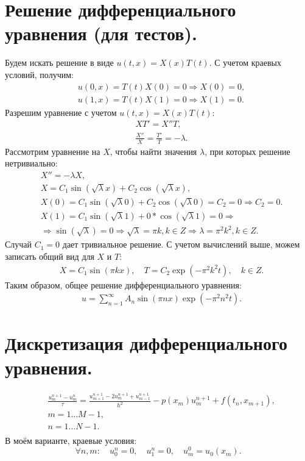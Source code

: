 \documentclass[14pt,a4paper]{extarticle}
\newcommand{\1}{\mathbbm{1}}
\begin{document}
\section{Решение дифференциального уравнения (для тестов).}\label{solution}
Будем искать решение в виде $u(t, x) = X(x) T(t)$. С учетом краевых условий, получим:
\begin{align*} 
    & u(0, x) = T(t) X(0) = 0 \Rightarrow X(0) = 0, \\
    & u(1, x) = T(t) X(1) = 0 \Rightarrow X(1) = 0.
\end{align*}
Разрешим уравнение с учетом $u(t, x) = X(x) T(t)$:
\begin{align*} 
    & X T' = X'' T, \\
    & \frac{X''}{X} = \frac{T'}{T} = -\lambda.
\end{align*}
Рассмотрим уравнение на $X$, чтобы найти значения $\lambda$, при которых решение нетривиально:
\begin{align*} 
    & X'' = -\lambda X, \\
    & X = C_1 \sin(\sqrt{\lambda} x) + C_2 \cos (\sqrt{\lambda} x), \\
    & X(0) = C_1 \sin(\sqrt{\lambda} 0) + C_2 \cos (\sqrt{\lambda} 0) = C_2 = 0 \Rightarrow C_2 = 0. \\
    & X(1) = C_1 \sin(\sqrt{\lambda} 1) + 0 * \cos (\sqrt{\lambda} 1)= 0 \Rightarrow \\ 
    & \Rightarrow \sin(\sqrt{\lambda}) = 0 \Rightarrow \sqrt{\lambda} = \pi k, k \in Z \Rightarrow \lambda = \pi^2 k^2, k \in Z.
\end{align*}
Случай $C_1 = 0$ дает тривиальное решение. С учетом вычислений выше, можем записать общий вид для $X$ и $T$:
\begin{align*} 
    & X = C_1 \sin(\pi k x), \quad T = C_2 \exp{(-\pi^2 k^2 t)}, \quad k \in Z.
\end{align*}
Таким образом, общее решение дифференциального уравнения:
\begin{align*} 
    & u = \sum_{n = 1}^{\infty} A_n \sin(\pi n x) \exp{(-\pi^2 n^2 t)}.
\end{align*}



\section{Дискретизация дифференциального уравнения.}
\begin{align} \label{scheme1}
    &\frac{u_m^{n+1} - u_m^n}{\tau} = \frac{u_{m+1}^{n+1} - 2 u_{m}^{n+1} + u_{m-1}^{n+1}}{h^2} - p(x_m) u_m^{n+1} + f(t_{n}, x_{m+1}),\\ 
    & m = 1 \ldots M-1, \\
    & n = 1 \ldots N-1. \\
\end{align}
В моём варианте, краевые условия:
\begin{equation} \label{schemeedge}
    \forall n, m: \quad u_0^{n} = 0, \quad u_1^{n} = 0, \quad u_m^{0} = u_0(x_m). 
\end{equation}
\end{document}
